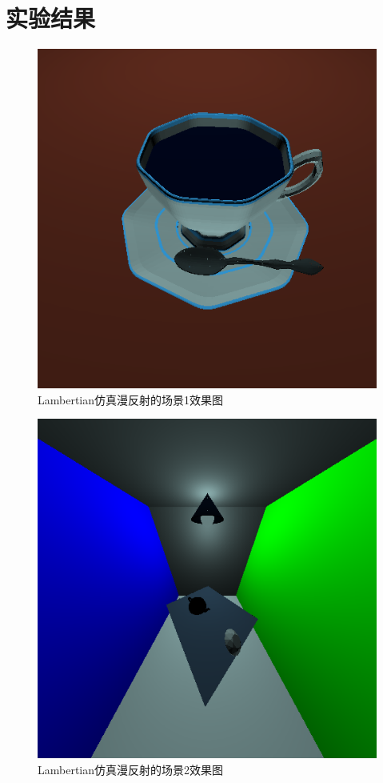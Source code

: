 \documentclass[10pt]{article}
\begin{document}
\section{实验结果}
\begin{figure}[H]
\begin{center}
\includegraphics[scale=0.5]{result1.png}
\end{center}
\caption{Lambertian仿真漫反射的场景1效果图}
\end{figure}

\begin{figure}[H]
\begin{center}
\includegraphics[scale=0.5]{result2.png}
\end{center}
\caption{Lambertian仿真漫反射的场景2效果图}
\end{figure}
\end{document}
